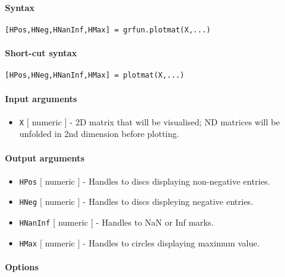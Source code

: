 


	\paragraph{Syntax}

\begin{verbatim}
[HPos,HNeg,HNanInf,HMax] = grfun.plotmat(X,...)
\end{verbatim}

\paragraph{Short-cut syntax}

\begin{verbatim}
[HPos,HNeg,HNanInf,HMax] = plotmat(X,...)
\end{verbatim}

\paragraph{Input arguments}

\begin{itemize}
\itemsep1pt\parskip0pt
\item
  \texttt{X} {[} numeric {]} - 2D matrix that will be visualised; ND
  matrices will be unfolded in 2nd dimension before plotting.
\end{itemize}

\paragraph{Output arguments}

\begin{itemize}
\item
  \texttt{HPos} {[} numeric {]} - Handles to discs displaying
  non-negative entries.
\item
  \texttt{HNeg} {[} numeric {]} - Handles to discs displeying negative
  entries.
\item
  \texttt{HNanInf} {[} numeric {]} - Handles to NaN or Inf marks.
\item
  \texttt{HMax} {[} numeric {]} - Handles to circles displaying maximum
  value.
\end{itemize}

\paragraph{Options}

